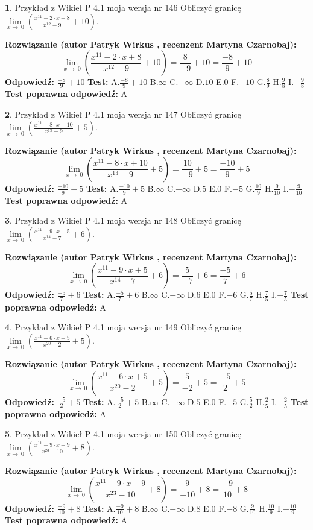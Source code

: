 \documentclass[12pt, a4paper]{article}
\theoremstyle{definition} %
\newtheorem{zad}{}
\newcommand{\zadStart}[1]{\begin{zad}#1\newline}
\newcommand{\zadStop}{\end{zad}}
\newcommand{\rozwStart}[2]{\noindent \textbf{Rozwiązanie (autor #1 , recenzent #2): }\newline}
\newcommand{\rozwStop}{\newline}
\newcommand{\odpStart}{\noindent \textbf{Odpowiedź:}\newline}
\newcommand{\odpStop}{\newline}
\newcommand{\testStart}{\noindent \textbf{Test:}\newline}
\newcommand{\testStop}{\newline}
\newcommand{\kluczStart}{\noindent \textbf{Test poprawna odpowiedź:}\newline}
\newcommand{\kluczStop}{\newline}
\begin{document}
\zadStart{Przykład z Wikieł P 4.1 moja wersja nr 146}
Obliczyć granicę $\lim\limits_{x\to\ 0}(\frac{x^{11}-2 \cdot x +8}{x^{12}-9}+10)$.
\zadStop
\rozwStart{Patryk Wirkus}{Martyna Czarnobaj}
$$\lim\limits_{x\to\ 0}(\frac{x^{11}-2 \cdot x +8}{x^{12}-9}+10)=\frac{8}{-9}+10=\frac{-8}{9}+10$$
\rozwStop
\odpStart
$\frac{-8}{9}+10$
\odpStop
\testStart
A.$\frac{-8}{9}+10$
B.$\infty$
C.$-\infty$
D.$10$
E.$0$
F.$-10$
G.$\frac{8}{9}$
H.$\frac{9}{8}$
I.$-\frac{9}{8}$
\testStop
\kluczStart
A
\kluczStop



\zadStart{Przykład z Wikieł P 4.1 moja wersja nr 147}
Obliczyć granicę $\lim\limits_{x\to\ 0}(\frac{x^{11}-8 \cdot x +10}{x^{13}-9}+5)$.
\zadStop
\rozwStart{Patryk Wirkus}{Martyna Czarnobaj}
$$\lim\limits_{x\to\ 0}(\frac{x^{11}-8 \cdot x +10}{x^{13}-9}+5)=\frac{10}{-9}+5=\frac{-10}{9}+5$$
\rozwStop
\odpStart
$\frac{-10}{9}+5$
\odpStop
\testStart
A.$\frac{-10}{9}+5$
B.$\infty$
C.$-\infty$
D.$5$
E.$0$
F.$-5$
G.$\frac{10}{9}$
H.$\frac{9}{10}$
I.$-\frac{9}{10}$
\testStop
\kluczStart
A
\kluczStop



\zadStart{Przykład z Wikieł P 4.1 moja wersja nr 148}
Obliczyć granicę $\lim\limits_{x\to\ 0}(\frac{x^{11}-9 \cdot x +5}{x^{14}-7}+6)$.
\zadStop
\rozwStart{Patryk Wirkus}{Martyna Czarnobaj}
$$\lim\limits_{x\to\ 0}(\frac{x^{11}-9 \cdot x +5}{x^{14}-7}+6)=\frac{5}{-7}+6=\frac{-5}{7}+6$$
\rozwStop
\odpStart
$\frac{-5}{7}+6$
\odpStop
\testStart
A.$\frac{-5}{7}+6$
B.$\infty$
C.$-\infty$
D.$6$
E.$0$
F.$-6$
G.$\frac{5}{7}$
H.$\frac{7}{5}$
I.$-\frac{7}{5}$
\testStop
\kluczStart
A
\kluczStop



\zadStart{Przykład z Wikieł P 4.1 moja wersja nr 149}
Obliczyć granicę $\lim\limits_{x\to\ 0}(\frac{x^{11}-6 \cdot x +5}{x^{20}-2}+5)$.
\zadStop
\rozwStart{Patryk Wirkus}{Martyna Czarnobaj}
$$\lim\limits_{x\to\ 0}(\frac{x^{11}-6 \cdot x +5}{x^{20}-2}+5)=\frac{5}{-2}+5=\frac{-5}{2}+5$$
\rozwStop
\odpStart
$\frac{-5}{2}+5$
\odpStop
\testStart
A.$\frac{-5}{2}+5$
B.$\infty$
C.$-\infty$
D.$5$
E.$0$
F.$-5$
G.$\frac{5}{2}$
H.$\frac{2}{5}$
I.$-\frac{2}{5}$
\testStop
\kluczStart
A
\kluczStop



\zadStart{Przykład z Wikieł P 4.1 moja wersja nr 150}
Obliczyć granicę $\lim\limits_{x\to\ 0}(\frac{x^{11}-9 \cdot x +9}{x^{23}-10}+8)$.
\zadStop
\rozwStart{Patryk Wirkus}{Martyna Czarnobaj}
$$\lim\limits_{x\to\ 0}(\frac{x^{11}-9 \cdot x +9}{x^{23}-10}+8)=\frac{9}{-10}+8=\frac{-9}{10}+8$$
\rozwStop
\odpStart
$\frac{-9}{10}+8$
\odpStop
\testStart
A.$\frac{-9}{10}+8$
B.$\infty$
C.$-\infty$
D.$8$
E.$0$
F.$-8$
G.$\frac{9}{10}$
H.$\frac{10}{9}$
I.$-\frac{10}{9}$
\testStop
\kluczStart
A
\kluczStop
\end{document}
